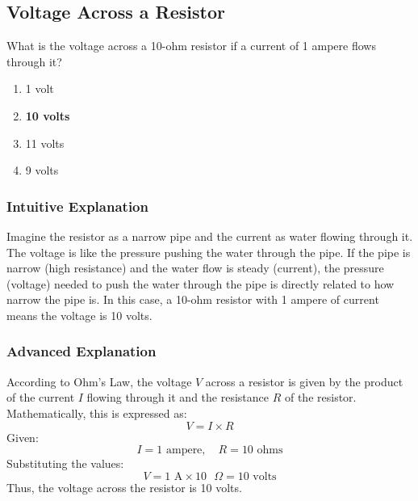 \subsection{Voltage Across a Resistor}
\label{T5D11}

\begin{tcolorbox}[colback=gray!10!white,colframe=black!75!black,title=T5D11]
What is the voltage across a 10-ohm resistor if a current of 1 ampere flows through it?
\begin{enumerate}[noitemsep]
    \item 1 volt
    \item \textbf{10 volts}
    \item 11 volts
    \item 9 volts
\end{enumerate}
\end{tcolorbox}

\subsubsection*{Intuitive Explanation}
Imagine the resistor as a narrow pipe and the current as water flowing through it. The voltage is like the pressure pushing the water through the pipe. If the pipe is narrow (high resistance) and the water flow is steady (current), the pressure (voltage) needed to push the water through the pipe is directly related to how narrow the pipe is. In this case, a 10-ohm resistor with 1 ampere of current means the voltage is 10 volts.

\subsubsection*{Advanced Explanation}
According to Ohm's Law, the voltage \( V \) across a resistor is given by the product of the current \( I \) flowing through it and the resistance \( R \) of the resistor. Mathematically, this is expressed as:
\[
V = I \times R
\]
Given:
\[
I = 1 \text{ ampere}, \quad R = 10 \text{ ohms}
\]
Substituting the values:
\[
V = 1 \text{ A} \times 10 \text{ }\Omega = 10 \text{ volts}
\]
Thus, the voltage across the resistor is 10 volts.